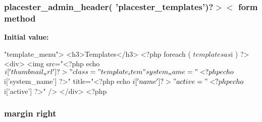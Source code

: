 \label{dd/db0/templates_8php_a29344aedac519f2779920e863d0c6214}
\hypertarget{templates_8php_af51fa061597b946ccd6f6bf5122eafe2}{
\subsubsection[{placester\_\-admin\_\-header}]{\setlength{\rightskip}{0pt plus 5cm}placester\_\-admin\_\-header( 'placester\_\-templates')?$>$$<$ form method}}
\label{dd/db0/templates_8php_af51fa061597b946ccd6f6bf5122eafe2}
{\bfseries Initial value:}
\begin{DoxyCode}
"template_menu">
            <h3>Templates</h3>
            <?php
            foreach ( $templates as $i ) {
                ?>
                <div>
                    <img src="<?php echo $i['thumbnail_url'] ?>" class="template_
      item" 
                        system_name="<?php echo $i['system_name'] ?>" 
                        title="<?php echo $i['name'] ?>" 
                        active="<?php echo $i['active'] ?>" />
                </div>
                <?php
            }
\end{DoxyCode}
\hypertarget{templates_8php_a9f3a98abc04200d1bbe440663d9aba96}{
\subsubsection[{right}]{\setlength{\rightskip}{0pt plus 5cm}margin {\bf right}}}
\label{dd/db0/templates_8php_a9f3a98abc04200d1bbe440663d9aba96}
